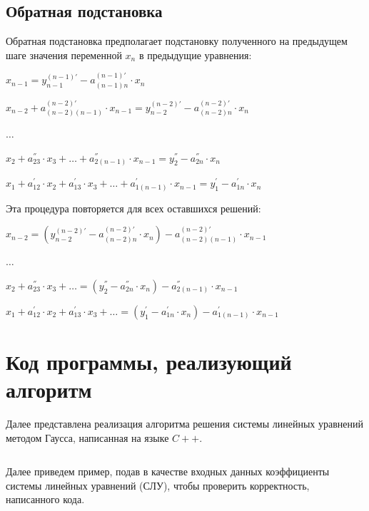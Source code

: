 \documentclass[bachelor, och, labwork]{shiza}
\begin{document}
  \subsection{Обратная подстановка}
  
  Обратная подстановка предполагает подстановку полученного на предыдущем шаге значения переменной $x_n$ в предыдущие уравнения:

  \begin{center}
    $x_{n-1} = y_{n-1}^{(n-1)'} - a_{(n-1)n}^{(n-1)'} \cdot x_n$
    
    $x_{n-2} + a_{(n-2)(n-1)}^{(n-2)'} \cdot x_{n-1} = y_{n-2}^{(n-2)'} - a_{(n-2)n}^{(n-2)'} \cdot x_n$

    $\ldots$

    $x_2 + a_{23}^{''} \cdot x_3 + \ldots + a_{2(n-1)}^{''} \cdot x_{n-1} = y_2^{''} - a_{2n}^{''} \cdot x_n$

    $x_1 + a_{12}^{'} \cdot x_2 + a_{13}^{'} \cdot x_3 + \ldots + a_{1(n-1)}^{'} \cdot x_{n-1} = y_1^{'} - a_{1n}^{'} \cdot x_n$
    
  \end{center}

  Эта процедура повторяется для всех оставшихся решений:

  \begin{center}    
    $x_{n-2} = (y_{n-2}^{(n-2)'} - a_{(n-2)n}^{(n-2)'} \cdot x_n) - a_{(n-2)(n-1)}^{(n-2)'} \cdot x_{n-1}$

    $\ldots$

    $x_2 + a_{23}^{''} \cdot x_3 + \ldots = (y_2^{''} - a_{2n}^{''} \cdot x_n) - a_{2(n-1)}^{''} \cdot x_{n-1}$

    $x_1 + a_{12}^{'} \cdot x_2 + a_{13}^{'} \cdot x_3 + \ldots = (y_1^{'} - a_{1n}^{'} \cdot x_n) - a_{1(n-1)}^{'} \cdot x_{n-1}$
    
  \end{center}

\section{Код программы, реализующий алгоритм}

  Далее представлена реализация алгоритма решения системы линейных уравнений методом Гаусса, написанная на языке $C++$.

  \inputminted[fontsize=\small]{C++}{code/gauss.cpp}

  Далее приведем пример, подав в качестве входных данных коэффициенты системы линейных уравнений (СЛУ), чтобы проверить корректность, написанного
  кода.
\end{document}
